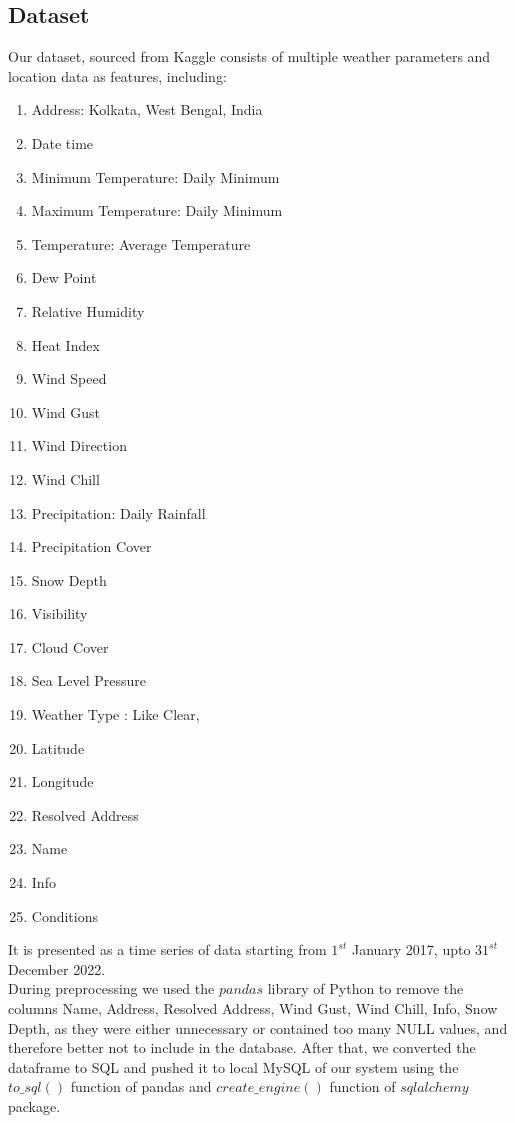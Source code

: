 \documentclass[12pt, a4paper]{article}
\begin{document}
\subsection{Dataset} 
Our dataset, sourced from Kaggle \cite{kaggleWeather_data_of_Kolkata} consists of multiple weather parameters and location data as features, including:
    \begin{enumerate}
    \item Address: Kolkata, West Bengal, India
    \item Date time 
    \item Minimum Temperature: Daily Minimum
    \item Maximum Temperature: Daily Minimum
    \item Temperature: Average Temperature
    \item Dew Point
    \item Relative Humidity
    \item Heat Index
    \item Wind Speed
    \item Wind Gust
    \item Wind Direction
    \item Wind Chill
    \item Precipitation: Daily Rainfall
    \item Precipitation Cover
    \item Snow Depth
    \item Visibility
    \item Cloud Cover
    \item Sea Level Pressure
    \item Weather Type : Like Clear, 
    \item Latitude
    \item Longitude
    \item Resolved Address
    \item Name
    \item Info
    \item Conditions
    \end{enumerate}
    It is presented as a time series of data starting from $1^{st}$ January 2017, upto $31^{st}$ December 2022. \\
    During preprocessing we used the $pandas$ library of Python to remove the columns Name, Address, Resolved Address, Wind Gust, Wind Chill, Info, Snow Depth, as they were either unnecessary or contained too many NULL values, and therefore better not to include in the database. After that, we converted the dataframe to SQL and pushed it to local MySQL of our system using the $to\_sql()$ function of pandas and $create\_engine()$ function of $sqlalchemy$ package.
\end{document}
